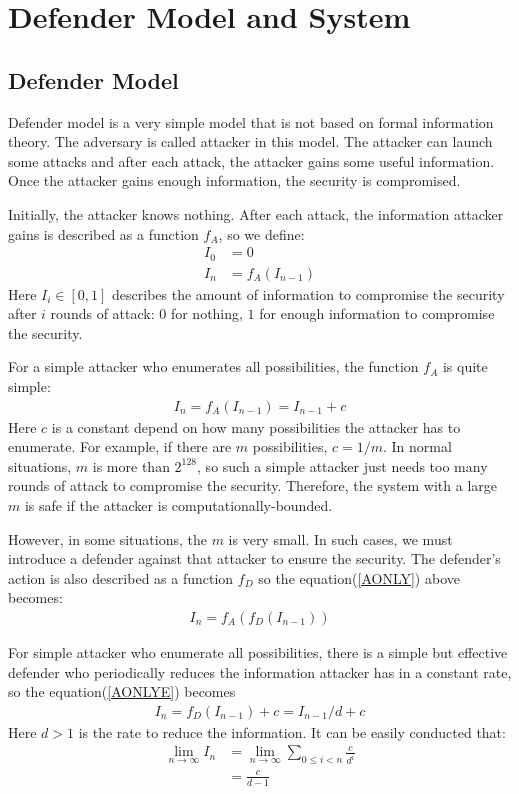 \documentclass[10pt,a4paper]{article}
\begin{document}
\section{Defender Model and System}
	\subsection{Defender Model}
		Defender model is a very simple model that
		is not based on formal information theory.
		The adversary is called attacker in this model.
		The attacker can launch some attacks and after
		each attack, the attacker gains some useful information.
		Once the attacker gains enough information, the security
		is compromised.
		
		Initially, the attacker knows nothing. After
		each attack, the information attacker gains
		is described as a function $f_A$, so we define:
		\begin{align}
			I_0 &= 0\\
			I_n &= f_A(I_{n-1})\label{AONLY}
		\end{align}
		Here $I_i \in [0, 1]$ describes the amount of information
		to compromise the security after $i$
		rounds of attack: $0$ for nothing, $1$ for enough
		information to compromise the security.
		
		For a simple attacker who enumerates all possibilities, the
		function $f_A$ is quite simple:
		\begin{align}
			I_n = f_A(I_{n-1}) = I_{n-1}+c\label{AONLYE}
		\end{align}
		Here $c$ is a constant depend on how many possibilities the
		attacker has to enumerate. For example, if there are
		$m$ possibilities, $c = 1/m$. In normal situations, $m$ is more
		than $2^{128}$, so such a simple attacker just needs too many rounds
		of attack to compromise the security. Therefore, the system with
		a large $m$ is safe if the attacker is computationally-bounded.
		
		However, in some situations, the $m$ is very small. In such cases,
		we must introduce a defender against that attacker to ensure the
		security. The defender's action is also described as a function $f_D$
		so the equation(\ref{AONLY}) above becomes:
		\begin{align}
			I_n = f_A(f_D(I_{n-1}))
		\end{align}
		
		For simple attacker who enumerate all possibilities,
		there is a simple but effective defender 
		who periodically reduces the information 
		attacker has in a constant rate, so
		the equation(\ref{AONLYE}) becomes
		\begin{align}
			I_n = f_D(I_{n-1})+c = I_{n-1}/d+c
		\end{align}
		Here $d > 1$ is the rate to reduce the information.
		It can be easily conducted that:
		\begin{align*}
			\lim_{n \rightarrow \infty} I_n &= \lim_{n \rightarrow \infty} \sum_{0 \leq i < n} \frac{c}{d^i}\\
				&= \frac{c}{d-1}
		\end{align*}
		
\end{document}
